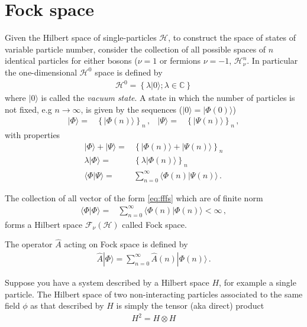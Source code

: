 \section{Fock space}

\begin{frame}
Given the Hilbert space of single-particles $\mathcal{H}$, to construct the space of states of variable particle number, consider the collection of all possible spaces of $n$ identical particles for either bosons ($\nu=1$ or fermions $\nu=-1$, $\mathcal{H}^n_{\nu}$. In particular the one-dimensional $\mathcal{H}^0$ space is defined by
\begin{align}
  \mathcal{H}^0=\left\{ \lambda|0\rangle;\lambda\in \mathbb{C} \right\}
\end{align}
where   $|0\rangle$ is called the \emph{vacuum state}.
A state in which the number of particles is not fixed, e.g $n\to\infty$, is given by the sequences ($|0\rangle=|\Phi(0)\rangle$)
\begin{align}
\label{eq:fffs}
  |\Phi\rangle=&\left\{ |\Phi(n)\rangle \right\}_n\,,&  |\Psi\rangle=&\left\{ |\Psi(n)\rangle \right\}_n\,,
\end{align}
with properties
\begin{align}
  |\Phi\rangle+|\Psi\rangle=&\left\{ |\Phi(n)\rangle+|\Psi(n)\rangle \right\}_n \nonumber\\
\lambda  |\Phi\rangle=& \left\{\lambda |\Phi(n)\rangle \right\}_n \nonumber\\
\langle\Phi|\Psi\rangle=&\sum_{n=0}^{\infty}\langle\Phi(n)|\Psi(n)\rangle\,.
\end{align}

The collection of all vector of the form \eqref{eq:fffs} which are of finite norm
\begin{align}
  \langle\Phi|\Phi\rangle=&\sum_{n=0}^{\infty}\langle\Phi(n)|\Phi(n)\rangle<\infty\,,
\end{align}
forms a Hilbert space $\mathcal{F}_{\nu}(\mathcal{H})$ called Fock space.

The operator  $\widehat{A}$ acting on Fock space is defined by
\begin{align}
\label{eq:Afi}
  \widehat{A}|\Phi\rangle=\sum_{n=0}^{\infty} \widehat{A}(n)|\Phi(n)\rangle\,.
\end{align}

Suppose you have a system described by a Hilbert space $H$, for example a single particle. The Hilbert space of two non-interacting particles associated to the same field $\phi$ as that described by $H$ is simply the tensor (aka direct) product
\begin{align}
  H^2 = H \otimes H
\end{align}


\end{frame}

